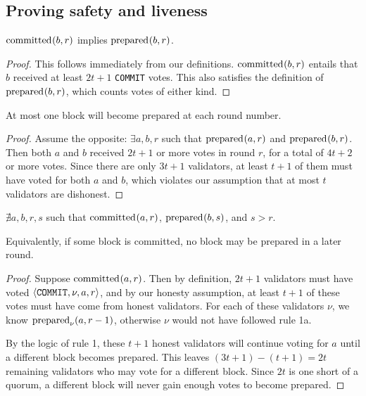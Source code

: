 \subsection{Proving safety and liveness}

\begin{lemma}\label{also-prepared}
  \( \committed{b, r} \) implies \( \prepared{b, r} \).
\end{lemma}

\begin{proof}
  This follows immediately from our definitions. $\committed{b, r}$ entails that $b$ received at least $2t + 1$ \texttt{COMMIT} votes. This also satisfies the definition of $\prepared{b, r}$, which counts votes of either kind.
\end{proof}

\begin{lemma}\label{uniqueness}
  At most one block will become prepared at each round number.
\end{lemma}

\begin{proof}
  Assume the opposite: $\exists a, b, r$ such that $\prepared{a, r}$ and $\prepared{b, r}$. Then both $a$ and $b$ received $2t + 1$ or more votes in round $r$, for a total of $4t + 2$ or more votes. Since there are only $3t + 1$ validators, at least $t + 1$ of them must have voted for both $a$ and $b$, which violates our assumption that at most $t$ validators are dishonest.
\end{proof}

\begin{lemma}\label{finality}
  $\nexists a, b, r, s$ such that $\committed{a, r}$, $\prepared{b, s}$, and $s > r$.

  Equivalently, if some block is committed, no block may be prepared in a later round.
\end{lemma}

\begin{proof}
  Suppose $\committed{a, r}$. Then by definition, $2t + 1$ validators must have voted $\commitvote{\nu, a, r}$, and by our honesty assumption, at least $t + 1$ of these votes must have come from honest validators. For each of these validators $\nu$, we know $\prepared[\nu]{a, r - 1}$, otherwise $\nu$ would not have followed rule 1a.

  By the logic of rule 1, these $t + 1$ honest validators will continue voting for $a$ until a different block becomes prepared. This leaves $(3t + 1) - (t + 1) = 2t$ remaining validators who may vote for a different block. Since $2t$ is one short of a quorum, a different block will never gain enough votes to become prepared.
\end{proof}

